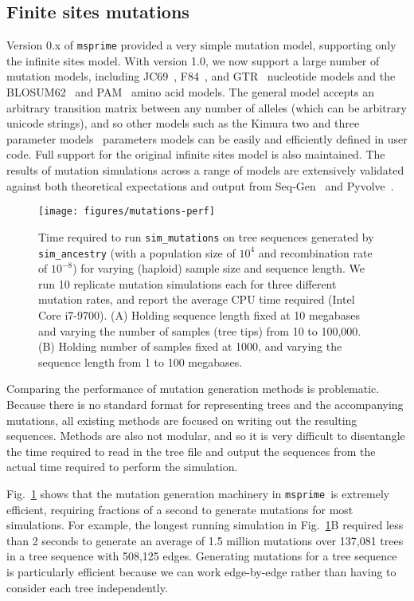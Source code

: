 \documentclass{article}
\newcommand{\msprime}[0]{\texttt{msprime}}
\begin{document}
\subsection*{Finite sites mutations}
Version 0.x of \texttt{msprime} provided a very simple mutation model,
supporting only the infinite sites model.
With version 1.0, we now support a large number of mutation models,
including
JC69~\citep{jukes1969evolution},
F84~\citep{felsenstein1996hidden},
and GTR~\citep{tavare1986some} nucleotide models
and the BLOSUM62~\citep{henikoff1992amino}
and PAM~\citep{dayhoff1978} amino acid models.
The general model accepts an arbitrary transition matrix between
any number of alleles (which can be arbitrary unicode strings),
and so other models such as the Kimura two and three
parameter models~\citep{kimura1980simple,kimura1981estimation}
parameters models can be easily
and efficiently defined in user code.
Full support for the original infinite sites model is also maintained.
The results of mutation simulations across a range of models are
extensively validated
against both theoretical expectations and output from
Seq-Gen~\citep{rambaut1997seq} and
Pyvolve~\citep{spielman2015pyvolve}.

\begin{figure}
\texttt{[image: figures/mutations-perf]}
\caption{\label{fig-mutations-perf} Time required to run
\texttt{sim\_mutations} on tree sequences generated
by \texttt{sim\_ancestry} (with a population size of $10^4$
and recombination rate of $10^{-8}$) for varying (haploid) sample
size and sequence length. We run 10 replicate mutation simulations
each for three different mutation rates, and report the average
CPU time required (Intel Core i7-9700).
(A) Holding sequence length fixed at 10 megabases and varying the
number of samples (tree tips) from 10 to 100,000.
(B) Holding number of samples fixed at 1000, and varying the sequence
length from 1 to 100 megabases.}
\end{figure}

Comparing the performance of mutation generation methods is problematic.
Because there is no standard format for representing trees and
the accompanying mutations, all existing methods are focused on
writing out the resulting sequences. Methods are also not modular,
and so it is very difficult to disentangle the time required to
read in the tree file and output the sequences from the actual
time required to perform the simulation.

Fig.~\ref{fig-mutations-perf} shows that the mutation generation
machinery in \msprime\ is extremely efficient, requiring
fractions of a second to generate mutations for most simulations.
For example, the longest running simulation in
Fig.~\ref{fig-mutations-perf}B required less than 2 seconds to
generate an average of 1.5 million mutations over 137,081 trees
in a tree sequence with 508,125 edges.
Generating mutations for a tree sequence is particularly efficient
because we can work edge-by-edge rather than having to
consider each tree independently.
\end{document}
